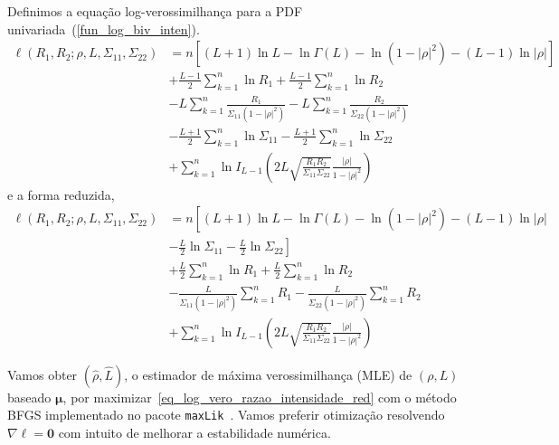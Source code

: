 Definimos a equação log-verossimilhança para a PDF univariada~(\ref{fun_log_biv_inten}).
\begin{equation}\nonumber
\begin{split} 
  \ell(R_1, R_2;\rho, L, \Sigma_{11}, \Sigma_{22})&=n\left[(L+1)\ln L - \ln\Gamma(L)- \ln(1-|\rho|^2)-(L-1)\ln|\rho|\right] \\
                        &+\frac{L-1}{2}\sum_{k=1}^{n} \ln R_1 +\frac{L-1}{2} \sum_{k=1}^{n}\ln R_2\\
                        &-L\sum_{k=1}^{n}\frac{R_1}{\Sigma_{11}(1-|\rho|^2)}-L\sum_{k=1}^{n}\frac{R_2}{\Sigma_{22}(1-|\rho|^2)}\\
	&-\frac{L+1}{2}\sum_{k=1}^{n}\ln\Sigma_{11}-\frac{L+1}{2}\sum_{k=1}^{n}\ln\Sigma_{22} \\
	&+\sum_{k=1}^{n}\ln I_{L-1}\left(2L\sqrt{\frac{R_1R_2}{\Sigma_{11}\Sigma_{22}}}\frac{|\rho|}{1-|\rho|^2}\right)
\end{split}
\end{equation} 
e a forma reduzida,
\begin{equation}\label{eq:log_vero_biv_prod_red}
\begin{split}
\ell(R_1, R_2;\rho, L, \Sigma_{11}, \Sigma_{22})&=n\left[(L+1)\ln L - \ln\Gamma(L)- \ln(1-|\rho|^2)-(L-1)\ln|\rho|\right. \\
	                    &-\left.\frac{L}{2}\ln\Sigma_{11}-\frac{L}{2}\ln\Sigma_{22}\right] \\
                        &+\frac{L}{2}\sum_{k=1}^{n} \ln R_1 +\frac{L}{2} \sum_{k=1}^{n}\ln R_2\\
                        &-\frac{L}{\Sigma_{11}(1-|\rho|^2)}\sum_{k=1}^{n}R_1-\frac{L}{\Sigma_{22}(1-|\rho|^2)}\sum_{k=1}^{n}R_2\\
	&+\sum_{k=1}^{n}\ln I_{L-1}\left(2L\sqrt{\frac{R_1R_2}{\Sigma_{11}\Sigma_{22}}}\frac{|\rho|}{1-|\rho|^2}\right)
\end{split}
 \end{equation} 

Vamos obter $(\widehat \rho, \widehat L)$, o estimador de máxima verossimilhança (MLE) de $(\rho, L)$ baseado $\bm \mu$, por maximizar~\eqref{eq_log_vero_razao_intensidade_red} com o método BFGS implementado no pacote \texttt{maxLik}~\citep{ht}. Vamos preferir otimização resolvendo $\nabla\ell=\bm 0$ com intuito de melhorar a estabilidade numérica.

